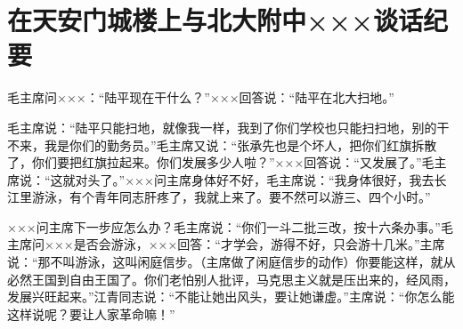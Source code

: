 \section[在天安门城楼上与北大附中×××谈话纪要（一九六六年八月十八日）]{在天安门城楼上与北大附中×××谈话纪要}


毛主席问×××：“陆平现在干什么？”×××回答说：“陆平在北大扫地。”

毛主席说：“陆平只能扫地，就像我一样，我到了你们学校也只能扫扫地，别的干不来，我是你们的勤务员。”毛主席又说：“张承先也是个坏人，把你们红旗拆散了，你们要把红旗拉起来。你们发展多少人啦？”×××回答说：“又发展了。”毛主席说：“这就对头了。”×××问主席身体好不好，毛主席说：“我身体很好，我去长江里游泳，有个青年同志肝疼了，我就上来了。要不然可以游三、四个小时。”

×××问主席下一步应怎么办？毛主席说：“你们一斗二批三改，按十六条办事。”毛主席问×××是否会游泳，×××回答：“才学会，游得不好，只会游十几米。”主席说：“那不叫游泳，这叫闲庭信步。（主席做了闲庭信步的动作）你要能这样，就从必然王国到自由王国了。你们老怕别人批评，马克思主义就是压出来的，经风雨，发展兴旺起来。”江青同志说：“不能让她出风头，要让她谦虚。”主席说：“你怎么能这样说呢？要让人家革命嘛！”

